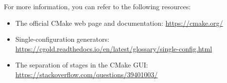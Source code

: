 
For more information, you can refer to the following resources:


\begin{itemize}
\item
The official CMake web page and documentation: \url{https://cmake.org/}

\item
Single-configuration generators:
\url{https://cgold.readthedocs.io/en/latest/glossary/single-config.html}

\item
The separation of stages in the CMake GUI: \url{https://stackoverflow.com/questions/39401003/}
\end{itemize}